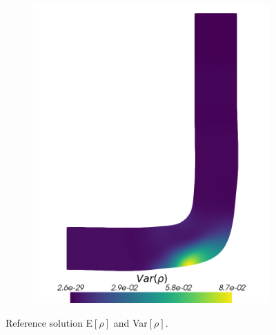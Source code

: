 \begin{figure}[H]
\begin{subfigure}{0.5\linewidth}
		\includegraphics[scale=0.2]{figs/pipe/pipe_sc_ref_n50_Var(rho).png}
		\label{fig:referenceSolutionsPipe2}
	\end{subfigure}
	\caption{Reference solution E$[\rho]$ and Var$[\rho]$.}
	\label{fig:referenceSolution3D}
\end{figure}
